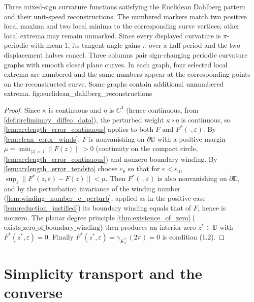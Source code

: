   {Three mixed-sign curvature functions satisfying the Euclidean Dahlberg
   pattern and their unit-speed reconstructions. The numbered markers match two
   positive local maxima and two local minima to the corresponding curve
   vertices; other local extrema may remain unmarked. Since every displayed
   curvature is $\pi$-periodic with mean $1$, its tangent angle gains $\pi$ over
   a half-period and the two displacement halves cancel.}
  {Three columns pair sign-changing periodic curvature graphs with smooth closed
   plane curves. In each graph, four selected local extrema are numbered and the
   same numbers appear at the corresponding points on the reconstructed curve.
   Some graphs contain additional unnumbered extrema.}
  {fig:euclidean_dahlberg_reconstructions}
\begin{proof}
  \leanok
  Since $\kappa$ is continuous and $\eta$ is $C^1$ (hence continuous, from
  \cref{def:preliminary_diffeo_data}), the perturbed weight $\kappa\circ\eta$ is
  continuous, so \cref{lem:arclength_error_continuous} applies to both $F$ and
  $F^*(\cdot,\varepsilon)$. By \cref{lem:clean_error_winds}, $F$ is nonvanishing on
  $\partial\mathbb{D}$ with a positive margin $\mu=\min_{|z|=1}\|F(z)\|>0$
  (continuity on the compact circle, \cref{lem:arclength_error_continuous}) and
  nonzero boundary winding. By
  \cref{lem:arclength_error_tendsto} choose $\varepsilon_0$ so that for
  $\varepsilon<\varepsilon_0$, $\sup_z\|F^*(z,\varepsilon)-F(z)\|<\mu$. Then
  $F^*(\cdot,\varepsilon)$ is also nonvanishing on $\partial\mathbb{D}$, and by the
  perturbation invariance of the winding number
  (\cref{lem:winding_number_c_perturb}, applied as in the positive-case
  \cref{lem:reduction_justified}) its boundary winding equals that of $F$, hence is
  nonzero. The planar degree principle \cref{thm:existence_of_zero}
  ($\mathrm{exists\_zero\_of\_boundary\_winding}$) then produces an interior zero
  $z^*\in\mathbb{D}$ with $F^*(z^*,\varepsilon)=0$. Finally
  $F^*(z^*,\varepsilon)=\gamma_{K^*_{z^*}}(2\pi)=0$ is condition (1.2).
\end{proof}

\section{Simplicity transport and the converse}

